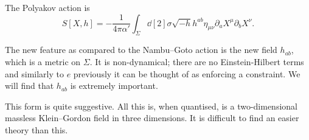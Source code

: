 \begin{definition}
  The Polyakov action is
  \begin{equation}
    \label{eq:polyakov}
    S[X, h] = -\frac{1}{4 \pi \alpha'} \int_{\Sigma} \dd[2]{\sigma} \sqrt{-h} h^{ab} \eta_{\mu\nu} \partial_{a} X^{\mu} \partial_{b} X^{\nu}.
  \end{equation}
\end{definition}

The new feature as compared to the Nambu--Goto action is the new field $h_{ab}$, which is a metric on $\Sigma$.
It is non-dynamical; there are no Einstein-Hilbert terms and similarly to $e$ previously it can be thought of as enforcing a constraint.
We will find that $h_{ab}$ is extremely important.
\begin{leftbar}
  This form is quite suggestive. All this is, when quantised, is a two-dimensional massless Klein--Gordon field in three dimensions. It is difficult to find an easier theory than this.
\end{leftbar}
